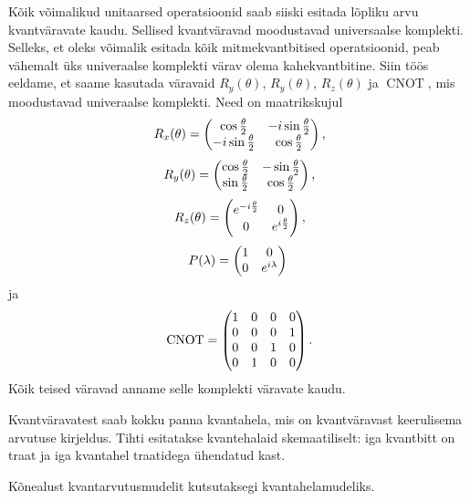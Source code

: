 \documentclass[12pt]{article}
\def\cnot{\mathop{\mathrm{CNOT}}}
\begin{document}
Kõik võimalikud unitaarsed operatsioonid saab siiski esitada lõpliku arvu kvantväravate kaudu.
Sellised kvantväravad moodustavad universaalse komplekti.
Selleks, et oleks võimalik esitada kõik mitmekvantbitised operatsioonid, peab vähemalt üks univeraalse komplekti värav olema kahekvantbitine.
Siin töös eeldame, et saame kasutada väravaid \(R_y(\theta)\), \(R_y(\theta)\), \(R_z(\theta)\) ja \(\cnot\), mis moodustavad univeraalse komplekti.
Need on maatrikskujul
\begin{equation}
    R_x(\theta)=\begin{pmatrix}
        \cos\frac{\theta}{2} & -i\sin\frac{\theta}{2} \cr
        -i\sin\frac{\theta}{2} & \cos\frac{\theta}{2} \cr
    \end{pmatrix}\rlap{,}
\end{equation}
\begin{equation}
    R_y(\theta)=\begin{pmatrix}
        \cos\frac{\theta}{2} & -\sin\frac{\theta}{2} \cr
        \sin\frac{\theta}{2} & \cos\frac{\theta}{2} \cr
    \end{pmatrix}\rlap{,}
\end{equation}
\begin{equation}
    R_z(\theta)=\begin{pmatrix}
        e^{-i\frac{\theta}{2}} & 0 \cr
        0 & e^{i\frac{\theta}{2}} \cr
    \end{pmatrix}\rlap{,}
\end{equation}
\begin{equation}
    P(\lambda)=\begin{pmatrix}
        1 & 0 \cr
        0 & e^{i\lambda} \cr
    \end{pmatrix}
\end{equation}
ja
\begin{equation}
    \cnot=\begin{pmatrix}
        1 & 0 & 0 & 0 \cr
        0 & 0 & 0 & 1 \cr
        0 & 0 & 1 & 0 \cr
        0 & 1 & 0 & 0 \cr
    \end{pmatrix}\rlap{.}
\end{equation}
Kõik teised väravad anname selle komplekti väravate kaudu.

Kvantväravatest saab kokku panna kvantahela, mis on kvantväravast keerulisema arvutuse kirjeldus.
Tihti esitatakse kvantehalaid skemaatiliselt: iga kvantbitt on traat ja iga kvantahel traatidega ühendatud kast.

Kõnealust kvantarvutusmudelit kutsutaksegi kvantahelamudeliks.
\end{document}
